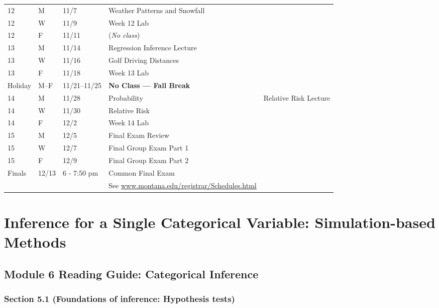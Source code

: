 \documentclass[
]{report}
\begin{document}
\begin{longtable}{|l|l|l|l|p{}|}
12& M& 11/7& Weather Patterns and Snowfall \\*
12& W& 11/9& Week 12 Lab \\*
12& F& 11/11& (\textit{No class}) \\ \hline
13& M& 11/14& Regression Inference Lecture \\*
13& W& 11/16& Golf Driving Distances \\*
13& F& 11/18& Week 13 Lab \\ \hline
Holiday& M--F& 11/21--11/25& \textbf{No Class --- Fall Break} \\ \hline
14& M& 11/28& Probability & Relative Risk Lecture \\*
14& W& 11/30& Relative Risk \\*
14& F& 12/2& Week 14 Lab \\ \hline
15& M& 12/5& Final Exam Review \\*
15& W& 12/7& Final Group Exam Part 1 \\*
15& F& 12/9& Final Group Exam Part 2 \\ \hline
Finals& 12/13& 6 - 7:50 pm & Common Final Exam \\
&  &  & See \url{www.montana.edu/registrar/Schedules.html} \\ \hline

\end{longtable}

\nocite{*}

\hypertarget{inference-for-a-single-categorical-variable-simulation-based-methods}{%
\chapter{Inference for a Single Categorical Variable: Simulation-based Methods}\label{inference-for-a-single-categorical-variable-simulation-based-methods}}

\hypertarget{module-6-reading-guide-categorical-inference}{%
\section{Module 6 Reading Guide: Categorical Inference}\label{module-6-reading-guide-categorical-inference}}

\hypertarget{section-5.1-foundations-of-inference-hypothesis-tests}{%
\subsection*{Section 5.1 (Foundations of inference: Hypothesis tests)}\label{section-5.1-foundations-of-inference-hypothesis-tests}}
\end{document}
